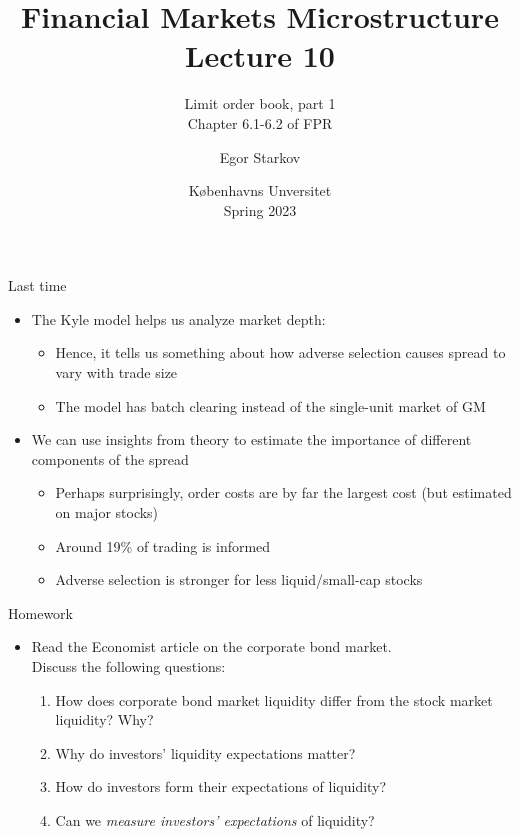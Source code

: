 \documentclass[english,10pt
,aspectratio=169
]{beamer}
\title{Financial Markets Microstructure \\ Lecture 10}
\subtitle{Limit order book, part 1\\
	Chapter 6.1-6.2 of FPR}
\author{Egor Starkov}
\date{K{\o}benhavns Unversitet \\
	Spring 2023}
\begin{document}
\frame[plain]{\titlepage}


\begin{frame}{Last time}
	\begin{itemize}
		\item The Kyle model helps us analyze market depth:
		\begin{itemize}
			\item Hence, it tells us something about how adverse selection causes spread to vary with trade size
			\item The model has batch clearing instead of the single-unit market of GM
		\end{itemize}
		\item We can use insights from theory to estimate the importance of different components of the spread
		\begin{itemize}
			\item Perhaps surprisingly, order costs are by far the largest cost (but estimated on major stocks)
			\item Around 19\% of trading is informed
			\item Adverse selection is stronger for less liquid/small-cap stocks
		\end{itemize}
	\end{itemize}
\end{frame}


\begin{frame}{Homework}
	\begin{itemize}
		\item Read the Economist article on the corporate bond market. 
		\\
		Discuss the following questions:
		\begin{enumerate}
			\item How does corporate bond market liquidity differ from the stock market liquidity? Why?
			\item Why do investors' liquidity expectations matter?
			\item How do investors form their expectations of liquidity?
			\item Can we \emph{measure investors' expectations} of liquidity?
		\end{enumerate}
	\end{itemize}
\end{frame}
\end{document}
